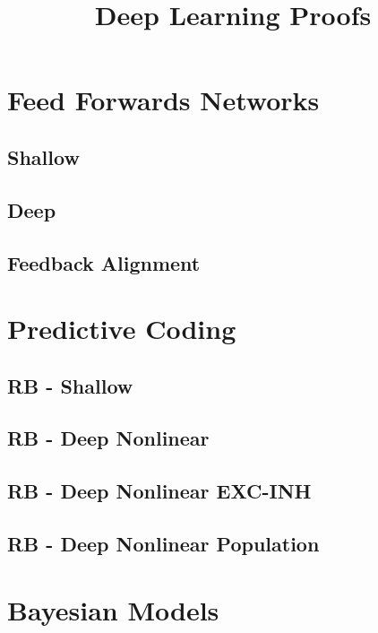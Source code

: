 \documentclass[a4paper,10pt]{article}
\title{Deep Learning Proofs}
\author{}
\begin{document}
\maketitle

\begin{abstract}

\end{abstract}

\section{Feed Forwards Networks}

\subsection{Shallow}

\subsection{Deep}

\subsection{Feedback Alignment}

\section{Predictive Coding}

\subsection{RB - Shallow}

\subsection{RB - Deep Nonlinear}

\subsection{RB - Deep Nonlinear EXC-INH}

\subsection{RB - Deep Nonlinear Population}

\section{Bayesian Models}
\end{document}
